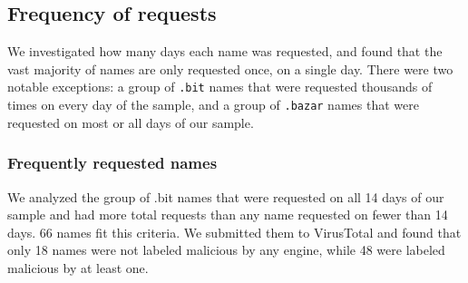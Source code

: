 %

%


\subsection{Frequency of requests}

We investigated how many days each name was requested, and found that the vast 
majority of names are only requested once, on a single day. There were two 
notable exceptions: a group of \texttt{.bit} names that were requested 
thousands of 
times on every day of the sample, and a group of \texttt{.bazar} names that 
were requested on most or all days of our sample.

\subsubsection{Frequently requested  names}

We analyzed the group of .bit names that were requested on all 14 days of our 
sample and had more total requests than any name requested on fewer than 14 
days. 66 names fit this criteria. We submitted them to VirusTotal and found 
that only 18 names were not labeled malicious by any engine, while 48 were 
labeled malicious by at least one. 

